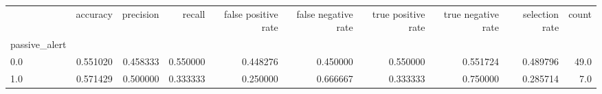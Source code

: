 \begin{tabular}{lrrrrrrrrr}
\toprule
{} &  accuracy &  precision &    recall &  false positive rate &  false negative rate &  true positive rate &  true negative rate &  selection rate &  count \\
passive\_alert &           &            &           &                      &                      &                     &                     &                 &        \\
\midrule
0.0           &  0.551020 &   0.458333 &  0.550000 &             0.448276 &             0.450000 &            0.550000 &            0.551724 &        0.489796 &   49.0 \\
1.0           &  0.571429 &   0.500000 &  0.333333 &             0.250000 &             0.666667 &            0.333333 &            0.750000 &        0.285714 &    7.0 \\
\bottomrule
\end{tabular}
